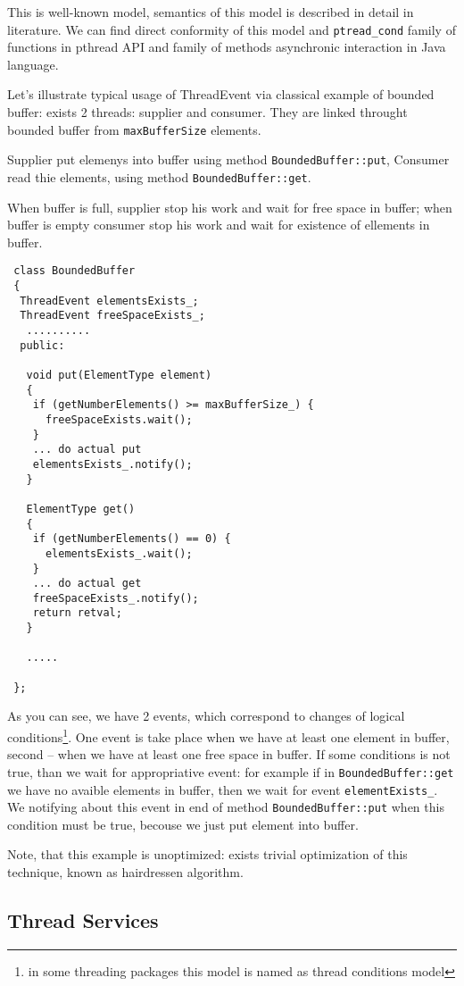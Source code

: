 \documentclass[10pt]{article}
\begin{document}
 This is well-known model, semantics of this model is described in detail
 in literature. We can find direct conformity of this model and
 \verb|ptread_cond| family of functions in pthread API and family
 of methods asynchronic interaction in Java language.

 Let's illustrate typical usage of ThreadEvent via classical example of
bounded buffer: exists 2 threads: supplier and consumer. They are
 linked throught bounded buffer from \verb|maxBufferSize| elements.

 Supplier put elemenys into buffer using method \verb|BoundedBuffer::put|,
Consumer read thie elements, using method \verb|BoundedBuffer::get|.

 When buffer is full, supplier stop his work and wait for free space in
buffer; when buffer is empty consumer stop his work and wait for existence
 of ellements in buffer.

 \begin{verbatim}
 class BoundedBuffer
 {
  ThreadEvent elementsExists_;
  ThreadEvent freeSpaceExists_;
   ..........
  public:

   void put(ElementType element)
   {
    if (getNumberElements() >= maxBufferSize_) {
      freeSpaceExists.wait(); 
    }
    ... do actual put
    elementsExists_.notify();
   }

   ElementType get()
   {
    if (getNumberElements() == 0) {
      elementsExists_.wait();
    }
    ... do actual get
    freeSpaceExists_.notify();
    return retval;
   }

   .....

 };
 \end{verbatim}

 As you can see, we have 2 events, which correspond to changes
of logical conditions\footnote{ in some threading packages this model is 
 named as thread conditions  model}. One event is take place when we
 have at least one element in buffer, second -- when we have at least
 one free space in buffer. If some conditions is not true, than we wait
 for appropriative event: for example if in \verb|BoundedBuffer::get|
 we have no avaible elements in buffer, then we wait for event 
\verb|elementExists_|. We notifying about this event in end of method
\verb|BoundedBuffer::put| when this condition must be true, becouse
 we just put element into buffer.

 Note, that this example is unoptimized: exists trivial optimization of
this technique, known as hairdressen algorithm.

\subsection{ Thread Services }
\end{document}
